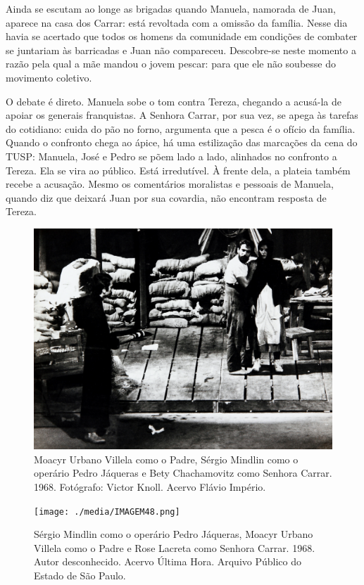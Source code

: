 Ainda se escutam ao longe as brigadas quando Manuela, namorada de Juan,
aparece na casa dos Carrar: está revoltada com a omissão da família.
Nesse dia havia se acertado que todos os homens da comunidade em
condições de combater se juntariam às barricadas e Juan não compareceu.
Descobre-se neste momento a razão pela qual a mãe mandou o jovem pescar:
para que ele não soubesse do movimento coletivo.

O debate é direto. Manuela sobe o tom contra Tereza, chegando a acusá-la
de apoiar os generais franquistas. A Senhora Carrar, por sua vez, se
apega às tarefas do cotidiano: cuida do pão no forno, argumenta que a
pesca é o ofício da família. Quando o confronto chega ao ápice, há uma
estilização das marcações da cena do TUSP: Manuela, José e Pedro se põem
lado a lado, alinhados no confronto a Tereza. Ela se vira ao público.
Está irredutível. À frente dela, a plateia também recebe a acusação.
Mesmo os comentários moralistas e pessoais de Manuela, quando diz que
deixará Juan por sua covardia, não encontram resposta de Tereza.

\begin{figure}
\includegraphics[width=\columnwidth]{./media/IMAGEM47.png}
\caption{Moacyr Urbano Villela como o Padre, Sérgio Mindlin como o operário Pedro Jáqueras e Bety Chachamovitz como Senhora Carrar. 1968. Fotógrafo:
Victor Knoll. Acervo Flávio Império.}
\end{figure}


\begin{figure}
\texttt{[image: ./media/IMAGEM48.png]}
\caption{Sérgio Mindlin como o operário Pedro Jáqueras, Moacyr Urbano Villela
como o Padre e Rose Lacreta como Senhora Carrar. 1968. Autor
desconhecido. Acervo Última Hora. Arquivo Público do Estado de São
Paulo.}
\end{figure}

